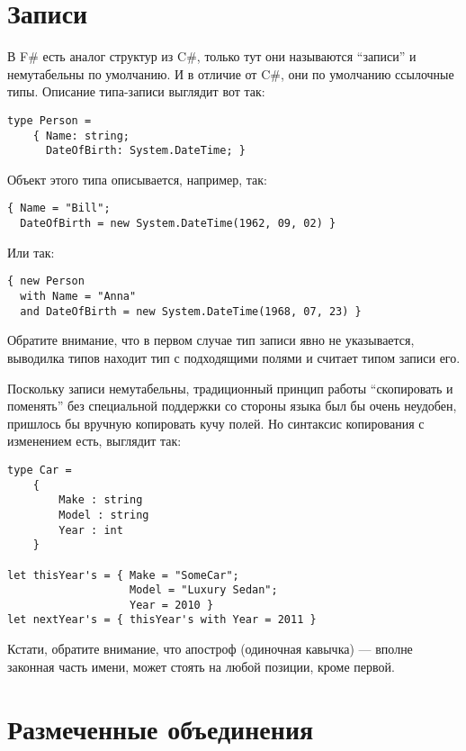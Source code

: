 \documentclass[a5paper]{article}
\begin{document}
\section{Записи}

В F\# есть аналог структур из C\#, только тут они называются ``записи'' и немутабельны по умолчанию. И в отличие от C\#, они по умолчанию ссылочные типы. Описание типа-записи выглядит вот так:

\begin{verbatim}
type Person =
    { Name: string;
      DateOfBirth: System.DateTime; }
\end{verbatim}

Объект этого типа описывается, например, так:

\begin{verbatim}
{ Name = "Bill"; 
  DateOfBirth = new System.DateTime(1962, 09, 02) }
\end{verbatim}

Или так:

\begin{verbatim}
{ new Person
  with Name = "Anna"
  and DateOfBirth = new System.DateTime(1968, 07, 23) }
\end{verbatim}

Обратите внимание, что в первом случае тип записи явно не указывается, выводилка типов находит тип с подходящими полями и считает типом записи его.

Поскольку записи немутабельны, традиционный принцип работы ``скопировать и поменять'' без специальной поддержки со стороны языка был бы очень неудобен, пришлось бы вручную копировать кучу полей. Но синтаксис копирования с изменением есть, выглядит так:

\begin{verbatim}
type Car =
    {
        Make : string
        Model : string
        Year : int
    }

let thisYear's = { Make = "SomeCar"; 
                   Model = "Luxury Sedan"; 
                   Year = 2010 }
let nextYear's = { thisYear's with Year = 2011 }
\end{verbatim}

Кстати, обратите внимание, что апостроф (одиночная кавычка) --- вполне законная часть имени, может стоять на любой позиции, кроме первой.

\section{Размеченные объединения}
\end{document}

